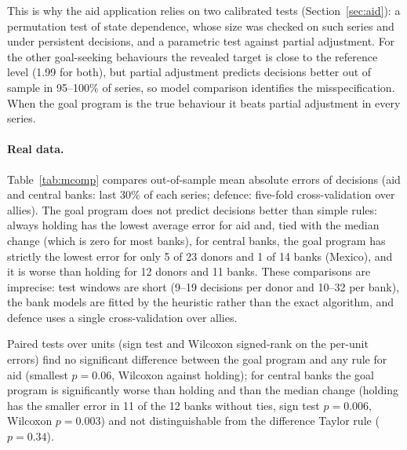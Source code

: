 \documentclass[pdflatex,sn-basic]{sn-jnl}
\theoremstyle{thmstyleone}\newtheorem{proposition}{Proposition}\newtheorem{theorem}{Theorem}
\theoremstyle{thmstylethree}\newtheorem{remark}{Remark}
\begin{document}
This is why the aid application relies on two calibrated tests (Section~\ref{sec:aid}): a permutation test of state dependence, whose size was checked on such series and under persistent decisions, and a parametric test against partial adjustment. For the other goal-seeking behaviours the revealed target is close to the reference level (1.99 for both), but partial adjustment predicts decisions better out of sample in 95--100\% of series, so model comparison identifies the misspecification. When the goal program is the true behaviour it beats partial adjustment in every series.
\begin{table}[t]\centering\small
\caption{Placebo and misspecification experiments (100 replications each; PA: linear partial adjustment fitted by least absolute deviations; out-of-sample comparisons on the last 30\% of each series).}\label{tab:placebo}\end{table}

\paragraph{Real data.} Table~\ref{tab:mcomp} compares out-of-sample mean absolute errors of decisions (aid and central banks: last 30\% of each series; defence: five-fold cross-validation over allies). The goal program does not predict decisions better than simple rules: always holding has the lowest average error for aid and, tied with the median change (which is zero for most banks), for central banks, the goal program has strictly the lowest error for only 5 of 23 donors and 1 of 14 banks (Mexico), and it is worse than holding for 12 donors and 11 banks. These comparisons are imprecise: test windows are short (9--19 decisions per donor and 10--32 per bank), the bank models are fitted by the heuristic rather than the exact algorithm, and defence uses a single cross-validation over allies.

Paired tests over units (sign test and Wilcoxon signed-rank on the per-unit errors) find no significant difference between the goal program and any rule for aid (smallest $p=0.06$, Wilcoxon against holding); for central banks the goal program is significantly worse than holding and than the median change (holding has the smaller error in 11 of the 12 banks without ties, sign test $p=0.006$, Wilcoxon $p=0.003$) and not distinguishable from the difference Taylor rule ($p=0.34$).
\end{document}
